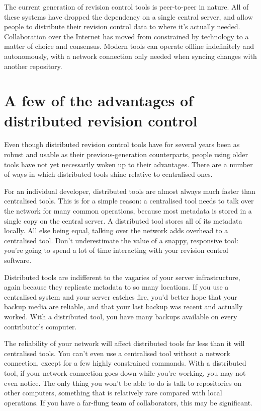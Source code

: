 The current generation of revision control tools is peer-to-peer in
nature.  All of these systems have dropped the dependency on a single
central server, and allow people to distribute their revision control
data to where it's actually needed.  Collaboration over the Internet
has moved from constrained by technology to a matter of choice and
consensus.  Modern tools can operate offline indefinitely and
autonomously, with a network connection only needed when syncing
changes with another repository.

\section{A few of the advantages of distributed revision control}

Even though distributed revision control tools have for several years
been as robust and usable as their previous-generation counterparts,
people using older tools have not yet necessarily woken up to their
advantages.  There are a number of ways in which distributed tools
shine relative to centralised ones.

For an individual developer, distributed tools are almost always much
faster than centralised tools.  This is for a simple reason: a
centralised tool needs to talk over the network for many common
operations, because most metadata is stored in a single copy on the
central server.  A distributed tool stores all of its metadata
locally.  All else being equal, talking over the network adds overhead
to a centralised tool.  Don't underestimate the value of a snappy,
responsive tool: you're going to spend a lot of time interacting with
your revision control software.

Distributed tools are indifferent to the vagaries of your server
infrastructure, again because they replicate metadata to so many
locations.  If you use a centralised system and your server catches
fire, you'd better hope that your backup media are reliable, and that
your last backup was recent and actually worked.  With a distributed
tool, you have many backups available on every contributor's computer.

The reliability of your network will affect distributed tools far less
than it will centralised tools.  You can't even use a centralised tool
without a network connection, except for a few highly constrained
commands.  With a distributed tool, if your network connection goes
down while you're working, you may not even notice.  The only thing
you won't be able to do is talk to repositories on other computers,
something that is relatively rare compared with local operations.  If
you have a far-flung team of collaborators, this may be significant.

